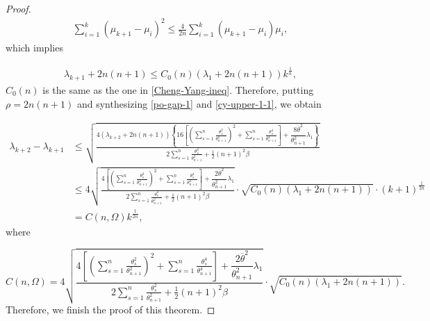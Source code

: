 \documentclass[12pt]{article}
\numberwithin{equation}{section}
\begin{document}
\begin{proof}
\begin{equation*}\begin{aligned}
\sum^{k}_{i=1}\left(\mu_{k+1}-\mu_{i}\right)^{2}\leq\frac{4}{2n}\sum^{k}_{i=1}\left(\mu_{k+1}-\mu_{i}\right)\mu_{i},
\end{aligned}\end{equation*}
which implies


\begin{equation}\begin{aligned}\label{cy-upper-1-1}
\lambda_{k+1}+2n(n+1)\leq C_{0}(n)(\lambda_{1}+2n(n+1))k^{\frac{1}{n}},
\end{aligned}\end{equation} $C_{0}(n)$ is the same as the one in \eqref{Cheng-Yang-ineq}.
Therefore, putting $\rho=2n(n+1)$  and synthesizing \eqref{po-gap-1} and \eqref{cy-upper-1-1}, we obtain

\begin{equation*}\begin{aligned}\lambda_{k+2}-\lambda_{k+1}
&\leq\sqrt{\frac{4(\lambda_{k+2}+2n(n+1))\left\{16\left[\left(\sum^{n}_{s=1}\frac{\theta_{s}^{2}}{\theta_{n+1}^{2}} \right)^{2}
+\sum^{n}_{s=1}\frac{\theta_{s}^{4}}{\theta_{n+1}^{4}}\right]
+\dfrac{8\overline{\theta}^{2}}{\theta^{2}_{n+1}}\lambda_{1}\right\}}
{2\sum^{n}_{s=1}\frac{\theta_{s}^{2}}{\theta_{n+1}^{2}}+\frac{1}{2}(n+1)^{2}\beta}}\\
&\leq4\sqrt{\frac{ 4\left[\left(\sum^{n}_{s=1}\frac{\theta_{s}^{2}}{\theta_{n+1}^{2}} \right)^{2}
+\sum^{n}_{s=1}\frac{\theta_{s}^{4}}{\theta_{n+1}^{4}}\right]+\dfrac{2\overline{\theta}^{2}}{\theta^{2}_{n+1}}\lambda_{1}}
{2\sum^{n}_{s=1}\frac{\theta_{s}^{2}}{\theta_{n+1}^{2}}+\frac{1}{2}(n+1)^{2}\beta}}\cdot\sqrt{C_{0}(n)(\lambda_{1}+2n(n+1))}\cdot (k+1)^{\frac{1}{2n}}\\
&=C(n,\Omega)k^{\frac{1}{2n}},
\end{aligned}\end{equation*} where

\begin{equation*}C(n,\Omega)=4\sqrt{\frac{ 4\left[\left(\sum^{n}_{s=1}\frac{\theta_{s}^{2}}{\theta_{n+1}^{2}} \right)^{2}
+\sum^{n}_{s=1}\frac{\theta_{s}^{4}}{\theta_{n+1}^{4}}\right]+\dfrac{2\overline{\theta}^{2}}{\theta^{2}_{n+1}}\lambda_{1}}
{2\sum^{n}_{s=1}\frac{\theta_{s}^{2}}{\theta_{n+1}^{2}}+\frac{1}{2}(n+1)^{2}\beta}}\cdot\sqrt{C_{0}(n)(\lambda_{1}+2n(n+1))}.\end{equation*}
Therefore, we finish the proof of this theorem.


\end{proof}
\end{document}
